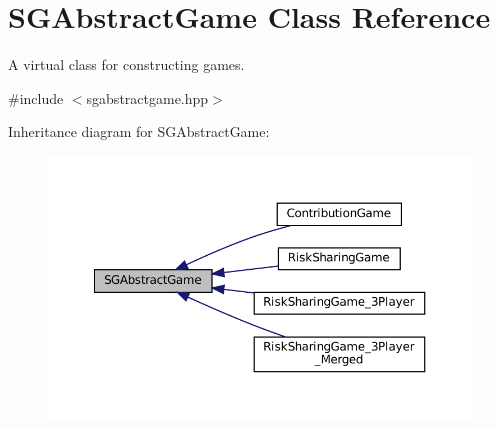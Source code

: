 \hypertarget{classSGAbstractGame}{}\section{S\+G\+Abstract\+Game Class Reference}
\label{classSGAbstractGame}


A virtual class for constructing games.  




{\ttfamily \#include $<$sgabstractgame.\+hpp$>$}



Inheritance diagram for S\+G\+Abstract\+Game\+:
\nopagebreak
\begin{figure}[H]
\begin{center}
\leavevmode
\includegraphics[width=350pt]{classSGAbstractGame__inherit__graph}
\end{center}
\end{figure}

